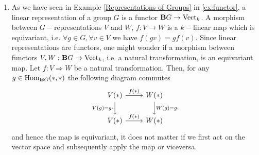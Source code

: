 \begin{ex}%
\label{ex:natural_trafos}
\hfill
\begin{enumerate}
    \item
    \label{Cat of representations}
    As we have seen in Example \ref{Representations of Groups} in \ref{ex:functor}, a linear representation of a group $G$ is a functor $\mathbf{B}G\to \operatorname{Vect}_k$. A morphism between $G-$representations $V$ and $W$, $f:V\to W$ is a $k-$linear map which is equivariant, i.e. $\forall g\in G, \forall v\in V$ we have $f(gv)=gf(v)$. Since linear representations are functors, one might wonder if a morphism between functors $V,W:\mathbf{B}G\to \operatorname{Vect}_k$, i.e. a natural transformation, is an equivariant map. Let $f:V\Rightarrow W$ be a natural transformation. Then, for any $g\in \operatorname{Hom}_{\mathbf{B}G}(\ast,\ast)$ the following diagram commutes
    \[ \begin{tikzcd}
        V(*) \ar[r, "f(*)"] \ar[d, "V(g) = g\cdot"'] & W(*) \ar[d, "W(g) = g\cdot"]\\
        V(*) \ar[r, "f(*)"] & W(*) 
    \end{tikzcd}\]
    and hence the map is equivariant, it does not matter if we first act on the vector space and subsequently apply the map or viceversa. 
    

\end{enumerate}
\end{ex}
